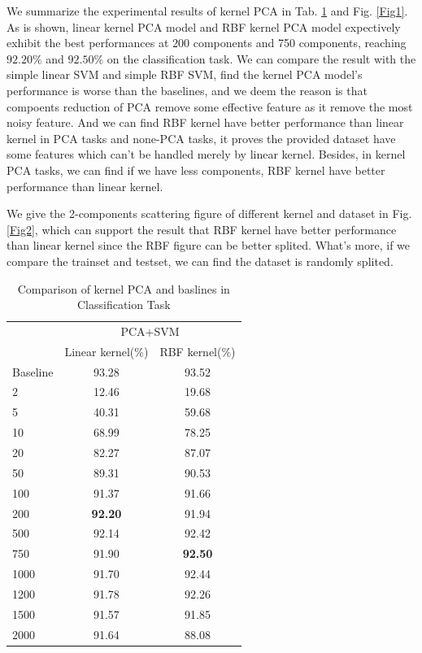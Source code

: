 \documentclass{article}
\begin{document}
We summarize the experimental results of kernel PCA in Tab. \ref{baseline1} and Fig. \ref{Fig1}. As is shown, linear kernel PCA model and RBF kernel PCA model expectively exhibit the best performances at 200 components and 750 components, reaching $92.20\%$ and $92.50\%$ on the classification task. We can compare the result with the simple linear SVM and simple RBF SVM, find the kernel PCA model's performance is worse than the baselines, and we deem the reason is that compoents reduction of PCA remove some effective feature as it remove the most noisy feature. And we can find RBF kernel have better performance than linear kernel in PCA tasks and none-PCA tasks, it proves the provided dataset have some features which can't be handled merely by linear kernel. Besides, in kernel PCA tasks, we can find if we have less components, RBF kernel have better performance than linear kernel.

We give the 2-components scattering figure of different kernel and dataset in Fig. \ref{Fig2}, which can support the result that RBF kernel have better performance than linear kernel since the RBF figure can be better splited. What's more, if we compare the trainset and testset, we can find the dataset is randomly splited.

\begin{table}[htbp]
	\centering
	\newcommand{\tabincell}[2]{\begin{tabular}{@{}#1@{}}#2\end{tabular}}
	\renewcommand\arraystretch{1.0}
	\caption{Comparison of kernel PCA and baslines in Classification Task}
	\label{baseline1}%
	\begin{tabular}{@{}p{2.5cm}<{\centering}|c|c}
		\hline
		\multirow{2}{*}{\diagbox[height=2\line,width=2.9cm,font=\tiny]{$d$}{Acc.}{$\mathit{M}$}} &\multicolumn{2}{c}{PCA+SVM}\\
		\cline{2-3}
			& {Linear kernel(\%)} & {RBF kernel(\%)}\\
		\cline{2-3}
		\hline
		Baseline & 93.28 & 93.52\\
		\hline
		2   & 12.46 & 19.68\\
		\hline
		5   & 40.31 & 59.68\\
		\hline
		10   & 68.99 & 78.25\\
		\hline
		20   & 82.27 & 87.07\\
		\hline
		50  & 89.31 & 90.53\\
		\hline
		100  & 91.37 & 91.66\\
		\hline
		200  & \textbf{92.20} & 91.94\\
		\hline
		500  & 92.14 & 92.42\\
		\hline
		750  & 91.90 & \textbf{92.50}\\
		\hline
		1000  & 91.70 & 92.44\\
		\hline
		1200  & 91.78 & 92.26\\
		\hline
		1500  & 91.57 & 91.85\\
		\hline
		2000  & 91.64 & 88.08\\
		\hline
	\end{tabular}
\end{table}
\end{document}

